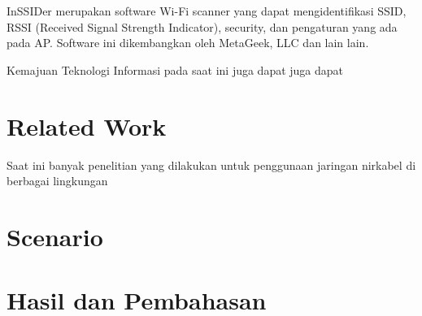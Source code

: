\documentclass[conference]{IEEEtran}
\begin{document}
\vspace{0.2cm}

InSSIDer merupakan software Wi-Fi scanner yang dapat
mengidentifikasi SSID, RSSI (Received Signal Strength Indicator),
security, dan pengaturan yang ada pada AP. Software
ini dikembangkan oleh MetaGeek, LLC dan lain lain.


Kemajuan Teknologi Informasi pada saat ini juga dapat juga dapat


\section{Related Work}
Saat ini banyak penelitian yang dilakukan untuk penggunaan jaringan nirkabel di berbagai lingkungan
\section{Scenario}

\begin{figure}[htbp]
    
\end{figure}

\section{Hasil dan Pembahasan}
\vspace{0.2cm}
\end{document}
